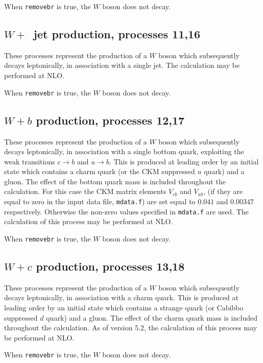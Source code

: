 \documentclass{article}
\begin{document}
When {\tt removebr} is true, the $W$ boson does not decay.

\subsection{$W+$~jet production, processes 11,16}
\label{subsec:w1jet}

These processes represent the production of a $W$ boson which subsequently
decays leptonically, in association with a single jet.
The calculation may be performed at NLO.

When {\tt removebr} is true, the $W$ boson does not decay.

\subsection{$W+b$ production, processes 12,17}
\label{subsec:wb}

These processes represent the production of a $W$ boson which
subsequently decays leptonically, in association with a single bottom
quark, exploiting the weak transitions $c \to b$ and $u \to b$.
This is produced at leading order by an initial state which
contains a charm quark (or the CKM  suppressed $u$ quark) and a
gluon.  The effect of the bottom quark mass is included throughout the
calculation.  
For this case the CKM matrix elements $V_{cb}$ and $V_{ub}$,
(if they are equal to zero in the input data file, {\tt mdata.f})
are set equal to $0.041$ and $0.00347$ respectively. 
Otherwise the non-zero values specified in {\tt mdata.f} are used. 
The calculation of this process may
be performed at NLO.

When {\tt removebr} is true, the $W$ boson does not decay.

\subsection{$W+c$ production, processes 13,18}
\label{subsec:wc}

These processes represent the production of a $W$ boson which
subsequently decays leptonically, in association with a charm
quark. This is produced at leading order by an initial state which
contains a strange quark (or Cabibbo suppressed $d$ quark) and a
gluon.  The effect of the charm quark mass is included throughout the
calculation.  As of version 5.2, the calculation of this process may
be performed at NLO.

When {\tt removebr} is true, the $W$ boson does not decay.
\end{document}
